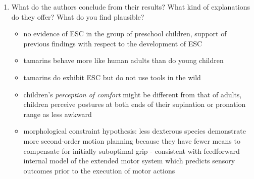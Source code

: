 \documentclass[12pt,english]{scrartcl}
\begin{document}
\begin{enumerate}
\item What do the authors conclude from their results? What kind of explanations do they offer? What do you find plausible?
 \color{blue}
 \begin{itemize}
 \item no evidence of ESC in the group of preschool children, support of previous findings with respect to the development of ESC
 \item tamarins behave more like human adults than do young children
 \item tamarins do exhibit ESC but do not use tools in the wild
 \item children's \textit{perception of comfort} might be different from that of adults, children perceive postures at both ends of their supination or pronation range as less awkward
 \item morphological constraint hypothesis: less dexterous species demonstrate more second-order motion planning because they have fewer means to compensate for initially suboptimal grip - consistent with feedforward internal model of the extended motor system which predicts sensory outcomes prior to the execution of motor actions

 
 
 \end{itemize}
  \color{black}

\end{enumerate}
\end{document}
